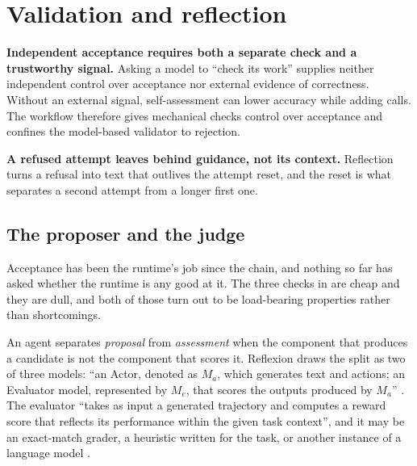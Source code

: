 \section{Validation and reflection}
\label{sec:validation}

\begin{upshot}
\item \textbf{Independent acceptance requires both a separate check and a trustworthy signal.}
  Asking a model to ``check its work'' supplies neither independent control over acceptance nor
  external evidence of correctness. Without an external signal, self-assessment can lower accuracy
  while adding calls. The workflow therefore gives mechanical checks control over acceptance and
  confines the model-based validator to rejection.
\item \textbf{A refused attempt leaves behind guidance, not its context.} Reflection turns a
  refusal into text that outlives the attempt reset, and the reset is what separates a second
  attempt from a longer first one.
\end{upshot}

\subsection{The proposer and the judge}
\label{sec:validation-actor}

Acceptance has been the runtime's job since the chain, and nothing so far has asked whether the
runtime is any good at it. The three checks in  are cheap and they are dull, and
both of those turn out to be load-bearing properties rather than shortcomings.

\begin{definition}
\label{def:actor-evaluator}
An agent separates \emph{proposal} from \emph{assessment} when the component that produces a candidate is not the component that scores it. Reflexion draws the split as two of three models: ``an Actor, denoted as $M_a$, which generates text and actions; an Evaluator model, represented by $M_e$, that scores the outputs produced by $M_a$'' \citep[\S3]{shinn2023reflexion}. The evaluator ``takes as input a generated trajectory and computes a reward score that reflects its performance within the given task context'', and it may be an exact-match grader, a heuristic written for the task, or another instance of a language model \citep[\S3]{shinn2023reflexion}.
\end{definition}

